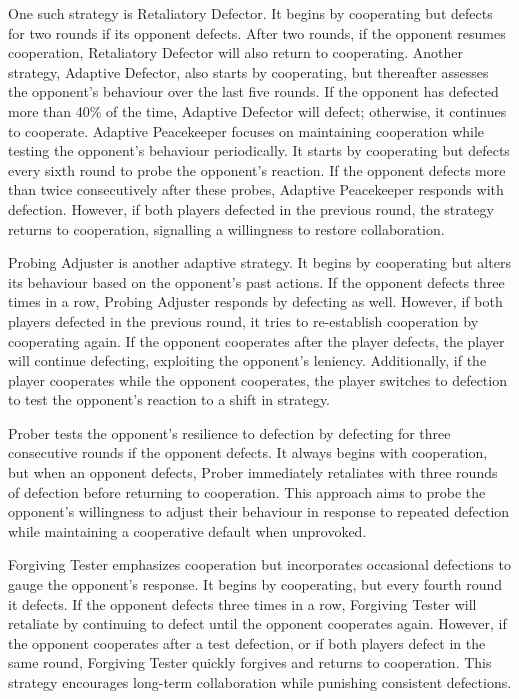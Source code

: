 \documentclass[11pt,preprint]{elsarticle}
\numberwithin{equation}{section}
\numberwithin{figure}{section}
\numberwithin{table}{section}
\begin{document}
One such strategy is Retaliatory Defector. It begins by cooperating but
defects for two rounds if its opponent defects. After two rounds, if the
opponent resumes cooperation, Retaliatory Defector will also return to
cooperating. Another strategy, Adaptive Defector, also starts by
cooperating, but thereafter assesses the opponent's behaviour over the
last five rounds. If the opponent has defected more than 40\% of the
time, Adaptive Defector will defect; otherwise, it continues to
cooperate. Adaptive Peacekeeper focuses on maintaining cooperation while
testing the opponent's behaviour periodically. It starts by cooperating
but defects every sixth round to probe the opponent's reaction. If the
opponent defects more than twice consecutively after these probes,
Adaptive Peacekeeper responds with defection. However, if both players
defected in the previous round, the strategy returns to cooperation,
signalling a willingness to restore collaboration.

Probing Adjuster is another adaptive strategy. It begins by cooperating
but alters its behaviour based on the opponent's past actions. If the
opponent defects three times in a row, Probing Adjuster responds by
defecting as well. However, if both players defected in the previous
round, it tries to re-establish cooperation by cooperating again. If the
opponent cooperates after the player defects, the player will continue
defecting, exploiting the opponent's leniency. Additionally, if the
player cooperates while the opponent cooperates, the player switches to
defection to test the opponent's reaction to a shift in strategy.

Prober tests the opponent's resilience to defection by defecting for
three consecutive rounds if the opponent defects. It always begins with
cooperation, but when an opponent defects, Prober immediately retaliates
with three rounds of defection before returning to cooperation. This
approach aims to probe the opponent's willingness to adjust their
behaviour in response to repeated defection while maintaining a
cooperative default when unprovoked.

Forgiving Tester emphasizes cooperation but incorporates occasional
defections to gauge the opponent's response. It begins by cooperating,
but every fourth round it defects. If the opponent defects three times
in a row, Forgiving Tester will retaliate by continuing to defect until
the opponent cooperates again. However, if the opponent cooperates after
a test defection, or if both players defect in the same round, Forgiving
Tester quickly forgives and returns to cooperation. This strategy
encourages long-term collaboration while punishing consistent
defections.
\end{document}
